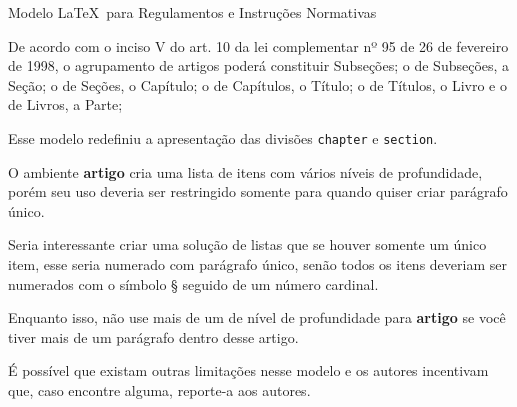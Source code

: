 \documentclass[11pt,twoside,a4paper]{inifsc}
\begin{document}
\begin{normativa}{Modelo \LaTeX~para Regulamentos e Instruções Normativas}
\begin{artigo}
    \item De acordo com o inciso V do art. 10 da lei complementar nº 95 de 26 de fevereiro de 1998, o agrupamento de artigos poderá constituir Subseções; o de Subseções, a Seção; o de Seções, o Capítulo; o de Capítulos, o Título; o de Títulos, o Livro e o de Livros, a Parte;
    \begin{artigo}
        \item Esse modelo redefiniu a apresentação das divisões \texttt{chapter} e \texttt{section}.
    \end{artigo}

    \item O ambiente \textbf{artigo} cria uma lista de itens com vários níveis de profundidade, porém seu uso deveria ser restringido somente para quando quiser criar parágrafo único.
    \begin{artigo}
        \item Seria interessante criar uma solução de listas que se houver somente um único item, esse seria numerado com parágrafo único, senão todos os itens deveriam ser numerados com o símbolo § seguido de um número cardinal.
        \begin{artigo}
            \item Enquanto isso, não use mais de um de nível de profundidade para \textbf{artigo} se você tiver mais de um parágrafo dentro desse artigo.
        \end{artigo}
    \end{artigo}

    \item É possível que existam outras limitações nesse modelo e os autores incentivam que, caso encontre alguma, reporte-a aos autores.
    
\end{artigo}

\end{normativa}
\end{document}

